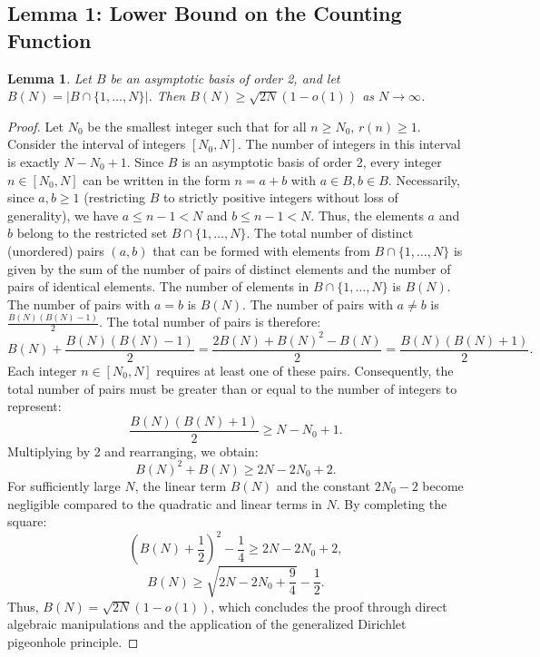 \documentclass[11pt,a4paper]{article}
\newtheorem{lemma}[theorem]{Lemma}
\begin{document}
\subsection{Lemma 1: Lower Bound on the Counting Function}
\begin{lemma}
Let $B$ be an asymptotic basis of order 2, and let $B(N) = |B \cap \{1, \dots, N\}|$. Then $B(N) \ge \sqrt{2N}(1 - o(1))$ as $N \to \infty$.
\end{lemma}
\begin{proof}
Let $N_0$ be the smallest integer such that for all $n \ge N_0$, $r(n) \ge 1$.
Consider the interval of integers $[N_0, N]$. The number of integers in this interval is exactly $N - N_0 + 1$.
Since $B$ is an asymptotic basis of order 2, every integer $n \in [N_0, N]$ can be written in the form $n = a + b$ with $a \in B, b \in B$.
Necessarily, since $a, b \ge 1$ (restricting $B$ to strictly positive integers without loss of generality), we have $a \le n - 1 < N$ and $b \le n - 1 < N$. Thus, the elements $a$ and $b$ belong to the restricted set $B \cap \{1, \dots, N\}$.
The total number of distinct (unordered) pairs $(a, b)$ that can be formed with elements from $B \cap \{1, \dots, N\}$ is given by the sum of the number of pairs of distinct elements and the number of pairs of identical elements.
The number of elements in $B \cap \{1, \dots, N\}$ is $B(N)$.
The number of pairs with $a = b$ is $B(N)$.
The number of pairs with $a \neq b$ is $\frac{B(N)(B(N) - 1)}{2}$.
The total number of pairs is therefore:
\begin{equation}
B(N) + \frac{B(N)(B(N) - 1)}{2} = \frac{2B(N) + B(N)^2 - B(N)}{2} = \frac{B(N)(B(N) + 1)}{2}.
\end{equation}
Each integer $n \in [N_0, N]$ requires at least one of these pairs. Consequently, the total number of pairs must be greater than or equal to the number of integers to represent:
\begin{equation}
\frac{B(N)(B(N) + 1)}{2} \ge N - N_0 + 1.
\end{equation}
Multiplying by 2 and rearranging, we obtain:
\begin{equation}
B(N)^2 + B(N) \ge 2N - 2N_0 + 2.
\end{equation}
For sufficiently large $N$, the linear term $B(N)$ and the constant $2N_0 - 2$ become negligible compared to the quadratic and linear terms in $N$. By completing the square:
\begin{equation}
\left(B(N) + \frac{1}{2}\right)^2 - \frac{1}{4} \ge 2N - 2N_0 + 2,
\end{equation}
\begin{equation}
B(N) \ge \sqrt{2N - 2N_0 + \frac{9}{4}} - \frac{1}{2}.
\end{equation}
Thus, $B(N) = \sqrt{2N}(1 - o(1))$, which concludes the proof through direct algebraic manipulations and the application of the generalized Dirichlet pigeonhole principle.
\end{proof}
\end{document}
